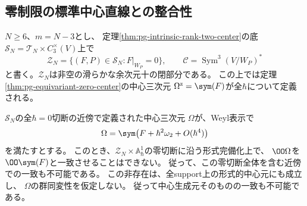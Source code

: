 \subsection{零制限の標準中心直線との整合性}

\begin{proposition}[零制限の中心直線への大域的一致の障害]
\label{prop:pg-intrinsic-zero-matching-obstruction}
$N\ge6$、$m=N-3$とし、
定理\ref{thm:pg-intrinsic-rank-two-center}の底
$\mathcal S_N=\mathcal T_N\times C_3^\times(V)$上で
\begin{equation}
 \mathcal Z_N=
 \{(F,P)\in\mathcal S_N:F|_{W_P}=0\},\qquad
 \mathcal C=\operatorname{Sym}^3(V/W_P)^*
 \label{eq:pg-intrinsic-zero-incidence}
\end{equation}
と書く。$\mathcal Z_N$は非空の滑らかな余次元十の閉部分である。
この上では定理\ref{thm:pg-equivariant-zero-center}の中心三次元
$\Omega^{\mathrm z}=\sym(F)$が全$\hbar$について定義される。

$\mathcal S_N$の全$\hbar=0$切断の近傍で定義された中心三次元
$\Omega$が、Weyl表示で
\begin{equation}
 \Omega=\sym\bigl(F+\hbar^2\omega_2+O(\hbar^4)\bigr)
 \label{eq:pg-intrinsic-zero-comparison-jet}
\end{equation}
を満たすとする。
このとき、$\mathcal Z_N\times\mathbb A^1_\hbar$の零切断に沿う形式完備化上で、
$\OO\Omega$を$\OO\sym(F)$と一致させることはできない。
従って、この零切断全体を含む近傍での一致も不可能である。
この非存在は、全support上の形式的中心元にも成立し、
$\Omega$の群同変性を仮定しない。
従って中心生成元そのものの一致も不可能である。
\end{proposition}

